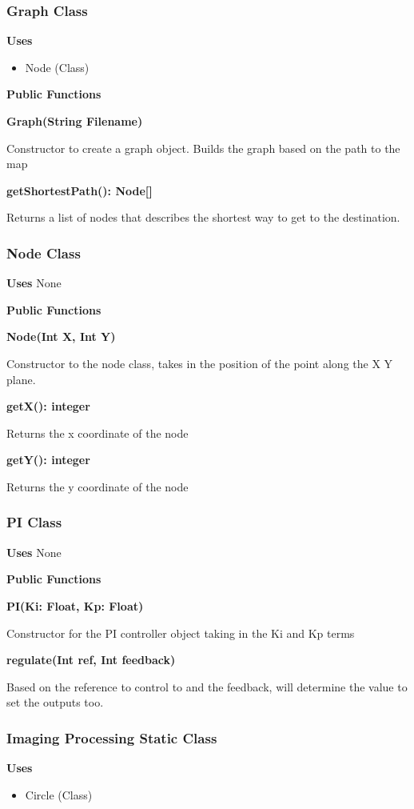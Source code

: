 \documentclass [10pt]{article}
\begin{document}
\subsubsection{Graph Class}
\textbf{Uses}
\begin{itemize}
	\item Node (Class)
\end{itemize}

\textbf{Public Functions}

\textbf{Graph(String Filename)}

Constructor to create a graph object. Builds the graph based on the path to the map

\textbf{getShortestPath(): Node[]}

Returns a list of nodes that describes the shortest way to get to the destination. 


\subsubsection{Node Class}
\textbf{Uses}
None 

\textbf{Public Functions}

\textbf{Node(Int X, Int Y)}

Constructor to the node class, takes in the position of the point along the X Y plane.

\textbf{getX(): integer}


Returns the x coordinate of the node

\textbf{getY(): integer}

Returns the y coordinate of the node

\subsubsection{PI Class}
\textbf{Uses}
None 

\textbf{Public Functions}

\textbf{PI(Ki: Float, Kp: Float)}

Constructor for the PI controller object taking in the Ki and Kp terms

\textbf{regulate(Int ref, Int feedback)}

Based on the reference to control to and the feedback, will determine the value to set the outputs too.

\subsubsection{Imaging Processing Static Class}
\textbf{Uses}
\begin{itemize}
	\item Circle (Class)
\end{itemize}
\end{document}

